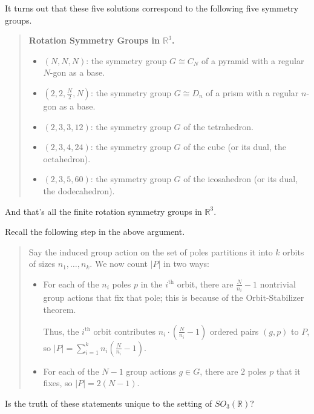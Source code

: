 It turns out that these five solutions correspond to the following five symmetry groups.

\begin{quote}
    \textbf{Rotation Symmetry Groups in $\mathbb{R}^3$.}
    \begin{itemize}
        \item $(N, N, N)$: the symmetry group $G \cong C_N$ of a pyramid with a regular $N$-gon as a base.
        \item $(2, 2, \tfrac{N}{2}, N)$: the symmetry group $G \cong D_n$ of a prism with a regular $n$-gon as a base.
        \item $(2, 3, 3, 12)$: the symmetry group $G$ of the tetrahedron.
        \item $(2, 3, 4, 24)$: the symmetry group $G$ of the cube (or its dual, the octahedron).
        \item $(2, 3, 5, 60)$: the symmetry group $G$ of the icosahedron (or its dual, the dodecahedron).
    \end{itemize}
\end{quote}

And that's all the finite rotation symmetry groups in $\mathbb{R}^3$.

\begin{remark}
    Recall the following step in the above argument.
    \begin{quote}
        Say the induced group action on the set of poles partitions it into $k$ orbits of sizes $n_1, \dots, n_k$.  We now count $|P|$ in two ways:
        \begin{itemize}
        \item For each of the $n_i$ poles $p$ in the $i^{\text{th}}$ orbit, there are $\frac{N}{n_i} - 1$ nontrivial group actions that fix that pole; this is because of the Orbit-Stabilizer theorem.
        
        Thus, the $i^{\text{th}}$ orbit contributes $n_i \cdot \left(\frac{N}{n_i} - 1\right)$ ordered pairs $(g, p)$ to $P$, so $|P| = \sum_{i = 1}^{k} n_i\left(\frac{N}{n_i} - 1\right)$.
        
        \item For each of the $N - 1$ group actions $g \in G$, there are $2$ poles $p$ that it fixes, so $|P| = 2(N - 1)$.
        \end{itemize}
    \end{quote}
    Is the truth of these statements unique to the setting of $SO_3(\mathbb{R})$?
\end{remark}

